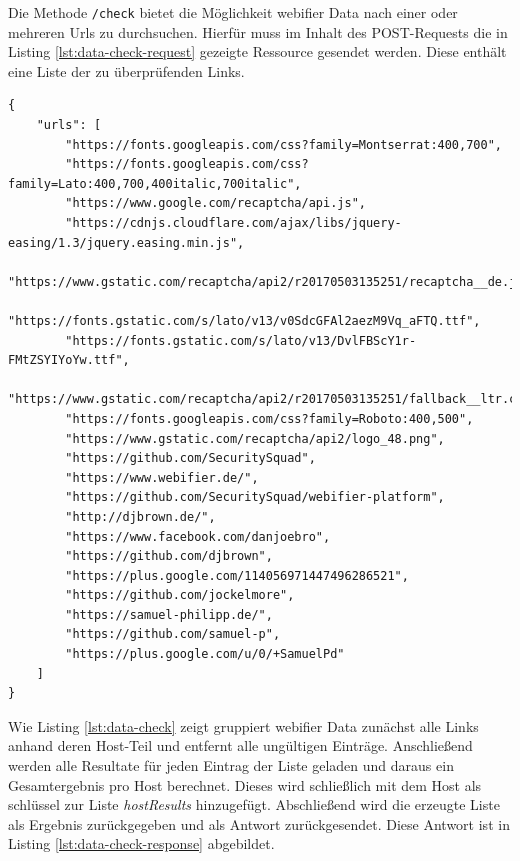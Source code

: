 Die Methode \lstinline[style=eclipse]{/check} bietet die Möglichkeit webifier Data nach einer oder mehreren Urls zu durchsuchen. Hierfür muss im Inhalt des POST-Requests die in Listing \ref{lst:data-check-request} gezeigte Ressource gesendet werden. Diese enthält eine Liste der zu überprüfenden Links.

\begin{scriptsize}
\begin{lstlisting}
{
    "urls": [
        "https://fonts.googleapis.com/css?family=Montserrat:400,700",
        "https://fonts.googleapis.com/css?family=Lato:400,700,400italic,700italic",
        "https://www.google.com/recaptcha/api.js",
        "https://cdnjs.cloudflare.com/ajax/libs/jquery-easing/1.3/jquery.easing.min.js",
        "https://www.gstatic.com/recaptcha/api2/r20170503135251/recaptcha__de.js",
        "https://fonts.gstatic.com/s/lato/v13/v0SdcGFAl2aezM9Vq_aFTQ.ttf",
        "https://fonts.gstatic.com/s/lato/v13/DvlFBScY1r-FMtZSYIYoYw.ttf",
        "https://www.gstatic.com/recaptcha/api2/r20170503135251/fallback__ltr.css",
        "https://fonts.googleapis.com/css?family=Roboto:400,500",
        "https://www.gstatic.com/recaptcha/api2/logo_48.png",
        "https://github.com/SecuritySquad",
        "https://www.webifier.de/",
        "https://github.com/SecuritySquad/webifier-platform",
        "http://djbrown.de/",
        "https://www.facebook.com/danjoebro",
        "https://github.com/djbrown",
        "https://plus.google.com/114056971447496286521",
        "https://github.com/jockelmore",
        "https://samuel-philipp.de/",
        "https://github.com/samuel-p",
        "https://plus.google.com/u/0/+SamuelPd"
    ]
}
\end{lstlisting}
\end{scriptsize}

Wie Listing \ref{lst:data-check} zeigt gruppiert webifier Data zunächst alle Links anhand deren Host-Teil und entfernt alle ungültigen Einträge. Anschließend werden alle Resultate für jeden Eintrag der Liste geladen und daraus ein Gesamtergebnis pro Host berechnet. Dieses wird schließlich mit dem Host als schlüssel zur Liste \textit{hostResults} hinzugefügt. Abschließend wird die erzeugte Liste als Ergebnis zurückgegeben und als Antwort zurückgesendet. Diese Antwort ist in Listing \ref{lst:data-check-response} abgebildet.

